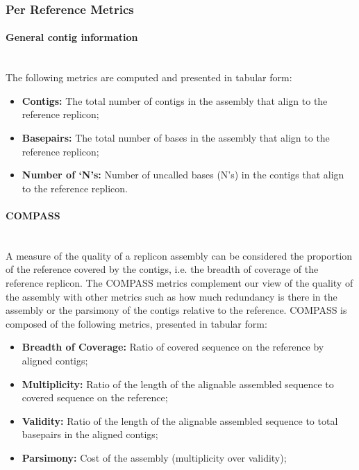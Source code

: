 \subsubsection{Per Reference Metrics} \label{ch5_supmaterial_metrics_reference}

\paragraph{General contig information} \mbox{}\\

The following metrics are computed and presented in tabular form: 

\begin{itemize}
    \item \textbf{Contigs:} The total number of contigs in the assembly that align to the reference replicon;
    \item \textbf{Basepairs:} The total number of bases in the assembly that align to the reference replicon;
    \item \textbf{Number of ‘N’s:} Number of uncalled bases (N's) in the contigs that align to the reference replicon.
\end{itemize}

\paragraph{COMPASS} \mbox{}\\

A measure of the quality of a replicon assembly can be considered the proportion of the reference covered by the contigs, i.e. the breadth of coverage of the reference replicon. The COMPASS metrics \cite{bradnam_assemblathon_2013} complement our view of the quality of the assembly with other metrics such as how much redundancy is there in the assembly or the parsimony of the contigs relative to the reference. COMPASS is composed of the following metrics, presented in tabular form:

\begin{itemize}
    \item \textbf{Breadth of Coverage:} Ratio of covered sequence on the reference by aligned contigs;
    \item \textbf{Multiplicity:} Ratio of the length of the alignable assembled sequence to covered sequence on the reference;
    \item \textbf{Validity:} Ratio of the length of the alignable assembled sequence to total basepairs in the aligned contigs;
    \item \textbf{Parsimony:} Cost of the assembly (multiplicity over validity);
\end{itemize}


